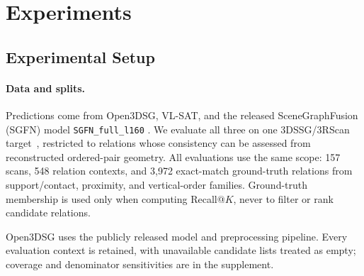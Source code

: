 \ifdefined\withteaser

\fi

\section{Experiments}

\subsection{Experimental Setup}

\paragraph{Data and splits.}
Predictions come from Open3DSG, VL-SAT, and the released SceneGraphFusion
(SGFN) model \texttt{SGFN\_full\_l160}
\cite{koch2024open3dsg,wang2023vlsat,wu2021scenegraphfusion}. We evaluate all
three on one 3DSSG/3RScan target~\cite{wald2019rio,wald2020learning3dssg}, restricted to
relations whose consistency can be assessed from reconstructed ordered-pair
geometry. All
evaluations use the same scope: 157 scans, 548
relation contexts, and 3,972 exact-match
ground-truth relations from support/contact, proximity, and vertical-order
families. Ground-truth membership is used only when
computing Recall@$K$, never to filter or rank candidate relations.

\ifdefined\withteaser\else

\fi

Open3DSG uses the publicly released model and preprocessing pipeline. Every
evaluation context is retained, with unavailable candidate lists treated as
empty; coverage and denominator sensitivities are in the supplement.

